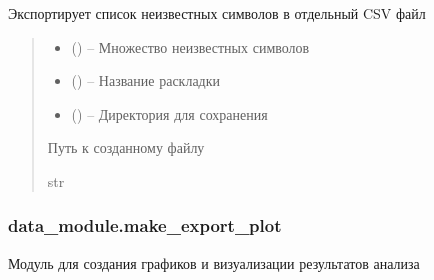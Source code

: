 \documentclass[a4paper,11pt,russian,openany,oneside]{sphinxmanual}
\begin{document}
\begin{savenotes}\begin{fulllineitems}
\label{\detokenize{_autosummary/data_module.make_export_file:data_module.make_export_file.export_unknown_characters_csv}}
\pysigstartsignatures
\pysiglinewithargsret
{}
{\sphinxparamcomma {}\sphinxparamcomma {}}
{}
\pysigstopsignatures
\sphinxAtStartPar
Экспортирует список неизвестных символов в отдельный CSV файл
\begin{quote}\begin{description}
\begin{itemize}
\item {} 
\sphinxAtStartPar
{} () – Множество неизвестных символов

\item {} 
\sphinxAtStartPar
{} () – Название раскладки

\item {} 
\sphinxAtStartPar
{} () – Директория для сохранения

\end{itemize}

\sphinxAtStartPar
Путь к созданному файлу

\sphinxAtStartPar
str

\end{description}\end{quote}

\end{fulllineitems}\end{savenotes}


\sphinxstepscope


\subsubsection{data\_module.make\_export\_plot}
\label{\detokenize{_autosummary/data_module.make_export_plot:module-data_module.make_export_plot}}\label{\detokenize{_autosummary/data_module.make_export_plot:data-module-make-export-plot}}\label{\detokenize{_autosummary/data_module.make_export_plot::doc}}
\sphinxAtStartPar
Модуль для создания графиков и визуализации результатов анализа
\end{document}
